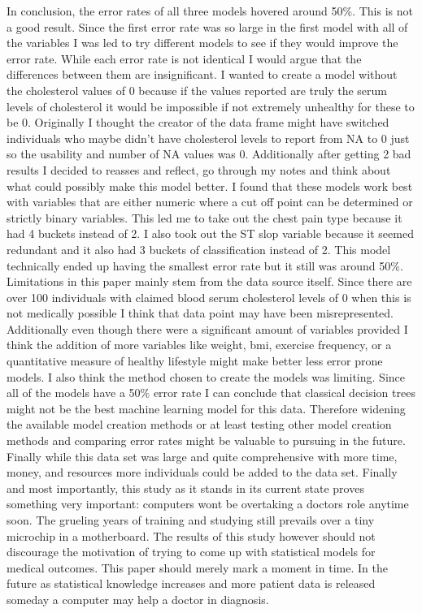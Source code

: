 \documentclass[12pt]{article}
\begin{document}
In conclusion, the error rates of all three models hovered around 50\%. This is not a good result. Since the first error rate was so large in the first model with all of the variables I was led to try different models to see if they would improve the error rate. While each error rate is not identical I would argue that the differences between them are insignificant. I wanted to create a model without the cholesterol values of 0 because if the values reported are truly the serum levels of cholesterol it would be impossible if not extremely unhealthy for these to be 0. Originally I thought the creator of the data frame might have switched individuals who maybe didn’t have cholesterol levels to report from NA to 0 just so the usability and number of NA values was 0. Additionally after getting 2 bad results I decided to reasses and reflect, go through my notes and think about what could possibly make this model better. I found that these models work best with variables that are either numeric where a cut off point can be determined or strictly binary variables. This led me to take out the chest pain type because it had 4 buckets instead of 2. I also took out the ST slop variable because it seemed redundant and it also had 3 buckets of classification instead of 2. This model technically ended up having the smallest error rate but it still was around 50\%. 
Limitations in this paper mainly stem from the data source itself. Since there are over 100 individuals with claimed blood serum cholesterol levels of 0 when this is not medically possible I think that data point may have been misrepresented. Additionally even though there were a significant amount of variables provided I think the addition of more variables like weight, bmi, exercise frequency, or a quantitative measure of healthy lifestyle might make better less error prone models. I also think the method chosen to create the models was limiting. Since all of the models have a 50\% error rate I can conclude that classical decision trees might not be the best machine learning model for this data. Therefore widening the available model creation methods or at least testing other model creation methods and comparing error rates might be valuable to pursuing in the future. Finally while this data set was large and quite comprehensive with more time, money, and resources more individuals could be added to the data set.
Finally and most importantly, this study as it stands in its current state proves something very important: computers won\textsc{}t be overtaking a doctor\textsc{}s role anytime soon. The grueling years of training and studying still prevails over a tiny microchip in a motherboard. The results of this study however should not discourage the motivation of trying to come up with statistical models for medical outcomes. This paper should merely mark a moment in time. In the future as statistical knowledge increases and more patient data is released someday a computer may help a doctor in diagnosis.




\end{document}
